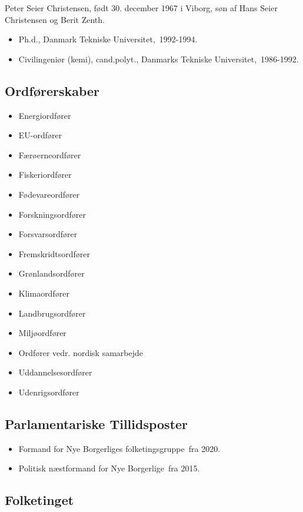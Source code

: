 \documentclass[11pt, a4paper]{awesome-cv}
\begin{document}
\makecvheader[R]
\makelettertitle
\begin{cvletter}
Peter Seier Christensen, født 30. december 1967 i Viborg, søn af Hans Seier Christensen og Berit Zenth.

\begin{itemize}
\item Ph.d., Danmark Tekniske Universitet, 1992-1994.
\item Civilingeniør (kemi), cand.polyt., Danmarks Tekniske Universitet, 1986-1992.
\end{itemize}
\subsection*{Ordførerskaber}
\begin{itemize}
\item Energiordfører
\item EU-ordfører
\item Færøerneordfører
\item Fiskeriordfører
\item Fødevareordfører
\item Forskningsordfører
\item Forsvarsordfører
\item Fremskridtsordfører
\item Grønlandsordfører
\item Klimaordfører
\item Landbrugsordfører
\item Miljøordfører
\item Ordfører vedr. nordisk samarbejde
\item Uddannelsesordfører
\item Udenrigsordfører
\end{itemize}
\subsection*{Parlamentariske Tillidsposter}
\begin{itemize}
\item Formand for Nye Borgerliges folketingsgruppe fra 2020.
\item Politisk næstformand for Nye Borgerlige fra 2015.
\end{itemize}
\subsection*{Folketinget}

\end{cvletter}
\end{document}
